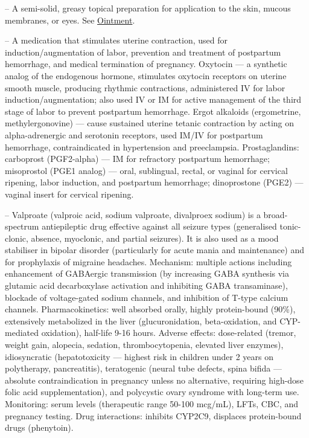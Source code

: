 -- A semi-solid, greasy topical preparation for application to the skin, mucous membranes, or eyes. See \hyperlink{Ointment}{Ointment}.

-- A medication that stimulates uterine contraction, used for induction/augmentation of labor, prevention and treatment of postpartum hemorrhage, and medical termination of pregnancy. Oxytocin — a synthetic analog of the endogenous hormone, stimulates oxytocin receptors on uterine smooth muscle, producing rhythmic contractions, administered IV for labor induction/augmentation; also used IV or IM for active management of the third stage of labor to prevent postpartum hemorrhage. Ergot alkaloids (ergometrine, methylergonovine) — cause sustained uterine tetanic contraction by acting on alpha-adrenergic and serotonin receptors, used IM/IV for postpartum hemorrhage, contraindicated in hypertension and preeclampsia. Prostaglandins: carboprost (PGF2-alpha) — IM for refractory postpartum hemorrhage; misoprostol (PGE1 analog) — oral, sublingual, rectal, or vaginal for cervical ripening, labor induction, and postpartum hemorrhage; dinoprostone (PGE2) — vaginal insert for cervical ripening.

-- Valproate (valproic acid, sodium valproate, divalproex sodium) is a broad-spectrum antiepileptic drug effective against all seizure types (generalised tonic-clonic, absence, myoclonic, and partial seizures). It is also used as a mood stabiliser in bipolar disorder (particularly for acute mania and maintenance) and for prophylaxis of migraine headaches. Mechanism: multiple actions including enhancement of GABAergic transmission (by increasing GABA synthesis via glutamic acid decarboxylase activation and inhibiting GABA transaminase), blockade of voltage-gated sodium channels, and inhibition of T-type calcium channels. Pharmacokinetics: well absorbed orally, highly protein-bound (90\%), extensively metabolized in the liver (glucuronidation, beta-oxidation, and CYP-mediated oxidation), half-life 9-16 hours. Adverse effects: dose-related (tremor, weight gain, alopecia, sedation, thrombocytopenia, elevated liver enzymes), idiosyncratic (hepatotoxicity — highest risk in children under 2 years on polytherapy, pancreatitis), teratogenic (neural tube defects, spina bifida — absolute contraindication in pregnancy unless no alternative, requiring high-dose folic acid supplementation), and polycystic ovary syndrome with long-term use. Monitoring: serum levels (therapeutic range 50-100 mcg/mL), LFTs, CBC, and pregnancy testing. Drug interactions: inhibits CYP2C9, displaces protein-bound drugs (phenytoin).

